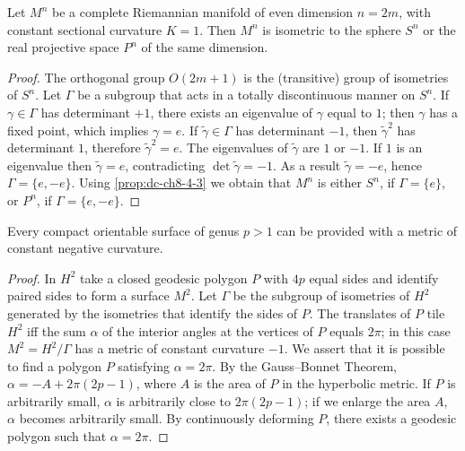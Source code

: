 \begin{proposition}[even-dimensional space forms of $K=1$]
  \label{prop:dc-ch8-4-4}


  Let $M^n$ be a complete Riemannian manifold of even dimension $n=2m$, with constant
  sectional curvature $K=1$. Then $M^n$ is isometric to the sphere $S^n$ or the real
  projective space $P^n$ of the same dimension.
\end{proposition}
\begin{proof}
\sketch
  The orthogonal group $O(2m+1)$ is the (transitive) group of isometries of
  $S^n$. Let $\Gamma$ be a subgroup that acts in a totally discontinuous manner on
  $S^n$. If $\gamma\in\Gamma$ has determinant $+1$, there exists an eigenvalue of
  $\gamma$ equal to $1$; then $\gamma$ has a fixed point, which implies $\gamma=e$.
  If $\tilde{\gamma}\in\Gamma$ has determinant $-1$, then $\tilde{\gamma}^2$ has
  determinant $1$, therefore $\tilde{\gamma}^2=e$. The eigenvalues of
  $\tilde{\gamma}$ are $1$ or $-1$. If $1$ is an eigenvalue then $\tilde{\gamma}=e$,
  contradicting $\det\tilde{\gamma}=-1$. As a result $\tilde{\gamma}=-e$, hence
  $\Gamma=\{e,-e\}$. Using \cref{prop:dc-ch8-4-3} we obtain that $M^n$ is either $S^n$, if
  $\Gamma=\{e\}$, or $P^n$, if $\Gamma=\{e,-e\}$.
\end{proof}

\begin{proposition}
  \label{prop:dc-ch8-4-5}


  Every compact orientable surface of genus $p>1$ can be provided with a metric of
  constant negative curvature.
\end{proposition}
\begin{proof}
\sketch
  In $H^2$ take a closed geodesic polygon $P$ with $4p$ equal sides and identify
  paired sides to form a surface $M^2$. Let $\Gamma$ be
  the subgroup of isometries of $H^2$ generated by the isometries that identify the
  sides of $P$. The translates of $P$ tile $H^2$ iff
  the sum $\alpha$ of the interior angles at the vertices of $P$ equals $2\pi$; in
  this case $M^2=H^2/\Gamma$ has a metric of constant curvature $-1$. We assert that
  it is possible to find a polygon $P$ satisfying $\alpha=2\pi$. By the Gauss–Bonnet
  Theorem, $\alpha=-A+2\pi(2p-1)$, where $A$ is the area of $P$ in the hyperbolic
  metric. If $P$ is arbitrarily small, $\alpha$ is arbitrarily close to $2\pi(2p-1)$;
  if we enlarge the area $A$, $\alpha$ becomes arbitrarily small. By continuously
  deforming $P$, there exists a geodesic polygon such that $\alpha=2\pi$.

\end{proof}

